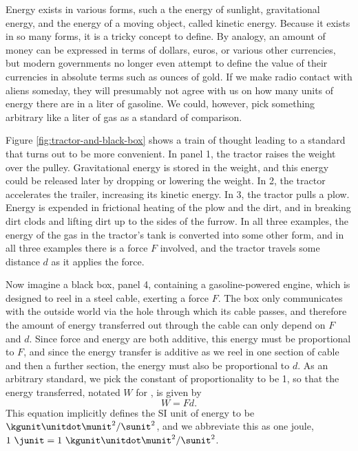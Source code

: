 Energy exists in various forms, such a the energy of sunlight,
gravitational energy, and the energy of a moving object,
called kinetic energy.
Because it exists in so many forms, it is a tricky concept to
define. By analogy, an amount of money can be expressed in terms
of dollars, euros, or various other currencies, but modern governments
no longer even attempt to define the value of their currencies in absolute
terms such as ounces of gold. If we make radio contact with aliens someday,
they will presumably not agree with us on how many units of energy there
are in a liter of gasoline. We could, however, pick something arbitrary
like a liter of gas as a standard of comparison.


Figure \ref{fig:tractor-and-black-box} shows a train of thought leading
to a standard that turns out to be more convenient. In panel 1,
the tractor raises the weight over
      the pulley. Gravitational energy is stored in the weight, and this energy could be released
      later by dropping or lowering the weight. In 2, the tractor accelerates the trailer,
      increasing its kinetic energy.
In 3, the tractor pulls a plow. Energy is
      expended in frictional heating of the
      plow and the dirt, and in breaking dirt
      clods and lifting dirt up to the sides of
      the furrow.
In all three examples, the energy of the gas in the tractor's tank is converted
into some other form, and in all three examples there is a force $F$ involved,
and the tractor travels some distance $d$ as it applies the force.

Now imagine a black box, panel 4, containing a gasoline-powered
engine, which is designed to reel in a steel cable, exerting a force $F$.
The box only communicates with the outside world via the hole through which its
cable passes, and therefore the amount of energy transferred out through the cable
can only depend on $F$ and $d$. Since force and energy are both additive, this
energy must be proportional to $F$, and since the energy transfer is additive
as we reel in one section of cable and then a further section, the energy
must also be proportional to $d$. As an arbitrary standard, we pick the constant
of proportionality to be 1, so that the energy transferred, notated $W$ for ,
is given by
\begin{equation}\label{eqn:work}
  W = Fd.
\end{equation}
This equation implicitly defines the SI unit of energy to be $\kgunit\unitdot\munit^2/\sunit^2$,
and we abbreviate this as one joule, $1\ \junit=1\ \kgunit\unitdot\munit^2/\sunit^2$.

